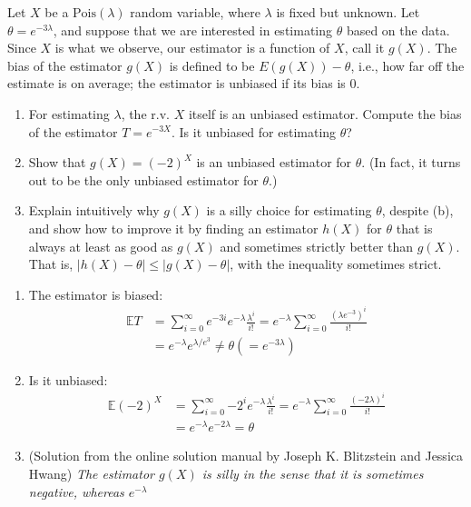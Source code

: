 
\setcounter{theorem}{65}
\begin{exercise} [BH.4.66] Let $X$ be a $\text{Pois}(\lambda)$ random variable, where $\lambda$ is fixed but unknown. Let $\theta = e^{-3 \lambda}$, and suppose that we are interested in estimating $\theta$ based on the data. Since $X$ is what we observe, our estimator is a function of $X$, call it $g(X)$. The bias of the estimator $g(X)$ is defined to be $E(g(X)) - \theta$, i.e., how far off the estimate is on average; the estimator is unbiased if its bias is 0.
	\begin{enumerate}
		\item For estimating $\lambda$, the r.v. $X$ itself is an unbiased estimator. Compute the bias of the estimator $T = e^{-3X}$. Is it unbiased for estimating $\theta$?
		\item Show that $g(X) = (-2)^X$ is an unbiased estimator for $\theta$. (In fact, it turns out to be the only unbiased estimator for $\theta$.)
		\item Explain intuitively why $g(X)$ is a silly choice for estimating $\theta$, despite (b), and show how to improve it by finding an estimator $h(X)$ for $\theta$ that is always at least as good as $g(X)$ and sometimes strictly better than $g(X)$. That is, $|h(X) - \theta| \leq |g(X) -\theta|$, with the inequality sometimes strict.
	\end{enumerate}
\begin{solution}
    \begin{enumerate}
	    \item The estimator is biased:
    	\begin{align*}
    		\mathbb{E}T &= \sum_{i=0}^{\infty} e^{-3i} e^{-\lambda}\frac{\lambda^i}{i!}= e^{-\lambda} \sum_{i=0}^{\infty}  \frac{\left(\lambda e^{-3} \right)^i}{i!} \\
    		&= e^{-\lambda} e^{\lambda/e^3} \neq \theta (=e^{-3\lambda})
    	\end{align*}
    	\item Is it unbiased:
    	\begin{align*}
    		\mathbb{E}(-2)^X  &= \sum_{i=0}^{\infty} {-2}^i e^{-\lambda}\frac{\lambda^i}{i!}= e^{-\lambda} \sum_{i=0}^{\infty}  \frac{\left(-2\lambda \right)^i}{i!} \\
    		&= e^{-\lambda} e^{-2\lambda} = \theta 
    	\end{align*} 
    	\item (Solution from the online solution manual by Joseph K. Blitzstein and Jessica Hwang) \textit{The estimator $g(X)$ is silly in the sense that it is sometimes negative, whereas $e^{-\lambda}$
}
\end{enumerate}
\end{solution}
\end{exercise}
